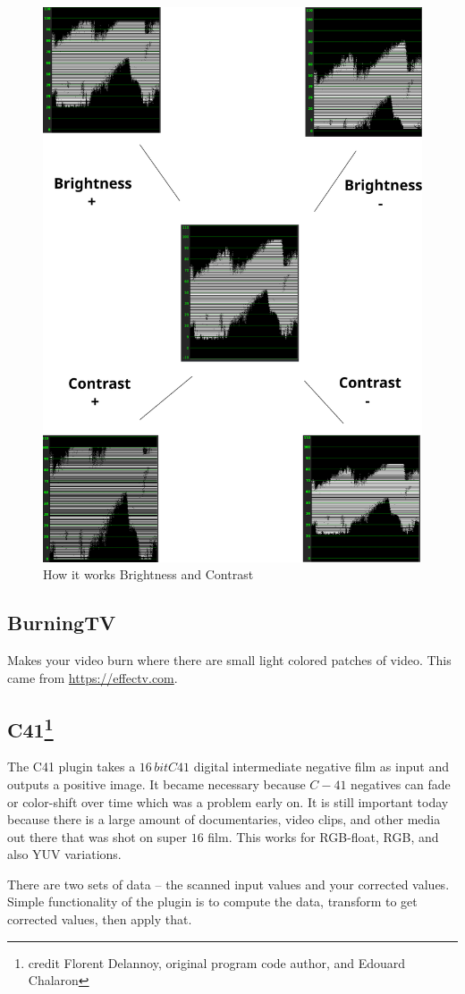 \begin{figure}[htpb]
    \centering
    \includegraphics[width=0.6\linewidth]{images/brightness.png}
    \caption{How it works Brightness and Contrast}
    \label{fig:brightness}
\end{figure}

\subsection{BurningTV}%
\label{sub:burningtv}

Makes your video burn where there are small light colored patches of video. This came from \url{https://effectv.com}.

\subsection[C41]{C41\protect\footnote{credit Florent Delannoy, original program code author, and Edouard Chalaron}}%
\label{sub:c41}

The C41 plugin takes a $16\,bit C41$ digital intermediate negative film as input and outputs a positive image. It became necessary because $C-41$ negatives can fade or color-shift over time which was a problem early on. It is still important today because there is a large amount of documentaries, video clips, and other media out there that was shot on super $16$ film. This works for RGB-float, RGB, and also YUV variations.

There are two sets of data -- the scanned input values and your corrected values. Simple functionality of the plugin is to compute the data, transform to get corrected values, then apply that.

